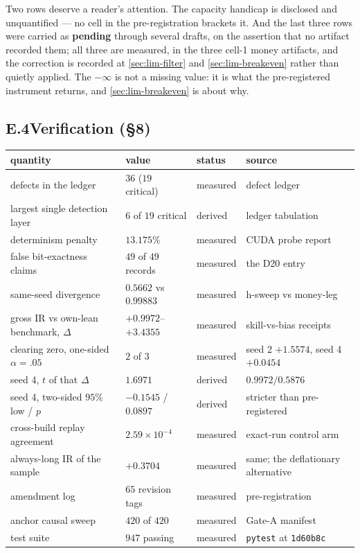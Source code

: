Two rows deserve a reader's attention. The capacity handicap is disclosed and unquantified --- no
cell in the pre-registration brackets it. And the last three rows were carried as \textbf{pending}
through several drafts, on the assertion that no artifact recorded them; all three are measured,
in the three cell-1 money artifacts, and the correction is recorded at \cref{sec:lim-filter} and
\cref{sec:lim-breakeven} rather than quietly applied. The $-\infty$ is not a missing value: it is
what the pre-registered instrument returns, and \cref{sec:lim-breakeven} is about why.

\subsection*{E.4\quad Verification (\S8)}

\begin{center}
\small
\begin{tabularx}{\linewidth}{lllX}
\toprule
quantity & value & status & source \\
\midrule
defects in the ledger & $36$ ($19$ critical) & measured & defect ledger \\
largest single detection layer & $6$ of $19$ critical & derived & ledger tabulation \\
determinism penalty & $13.175\%$ & measured & CUDA probe report \\
false bit-exactness claims & $49$ of $49$ records & measured & the D20 entry \\
same-seed divergence & $0.5662$ vs $0.99883$ & measured & h-sweep vs money-leg \\
gross IR vs own-lean benchmark, $\Delta$ & $+0.9972$--$+3.4355$ & measured & skill-vs-bias receipts \\
\quad clearing zero, one-sided $\alpha{=}.05$ & $2$ of $3$ & measured & seed 2 $+1.5574$, seed 4 $+0.0454$ \\
\quad seed 4, $t$ of that $\Delta$ & $1.6971$ & derived & $0.9972/0.5876$ \\
\quad seed 4, two-sided $95\%$ low / $p$ & $-0.1545$ / $0.0897$ & derived & stricter than pre-registered \\
\quad cross-build replay agreement & $2.59\times10^{-4}$ & measured & exact-run control arm \\
\quad always-long IR of the sample & $+0.3704$ & measured & same; the deflationary alternative \\
amendment log & $65$ revision tags & measured & pre-registration \\
anchor causal sweep & $420$ of $420$ & measured & Gate-A manifest \\
test suite & $947$ passing & measured & \texttt{pytest} at \texttt{1d60b8c} \\
\bottomrule
\end{tabularx}
\end{center}

